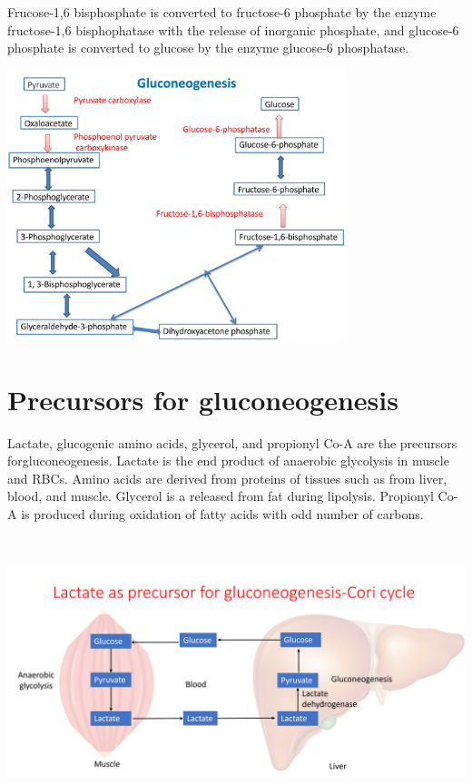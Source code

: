 \documentclass[
]{book}
\begin{document}
Frucose-1,6 bisphosphate is converted to fructose-6 phosphate by the enzyme fructose-1,6 bisphophatase with the release of inorganic phosphate, and glucose-6 phosphate is converted to glucose by the enzyme glucose-6 phosphatase.

\includegraphics[width=\textwidth,height=3.125in]{Images/gluconeogenesis.png}

\section{Precursors for gluconeogenesis}\label{precursors-for-gluconeogenesis}

Lactate, glucogenic amino acids, glycerol, and propionyl Co-A are the precursors forgluconeogenesis. Lactate is the end product of anaerobic glycolysis in muscle and RBCs. Amino acids are derived from proteins of tissues such as from liver, blood, and muscle. Glycerol is a released from fat during lipolysis. Propionyl Co-A is produced during oxidation of fatty acids with odd number of carbons.

\includegraphics[width=\textwidth,height=3.125in]{Images/cori.png}
\end{document}

